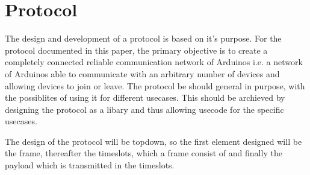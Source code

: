 \section{Protocol}
The design and development of a protocol is based on it's purpose.
For the protocol documented in this paper, the primary objective is to create a completely connected reliable communication network of Arduinos i.e. a network of Arduinos able to communicate with an arbitrary number of devices and allowing devices to join or leave.
The protocol be should general in purpose, with the possiblites of using it for different usecases.
This should be archieved by designing the protocol as a libary and thus allowing usecode for the specific usecases.

The design of the protocol will be topdown, so the first element designed will be the frame, thereafter the timeslots, which a frame consist of and finally the payload which is transmitted in the timeslots. 